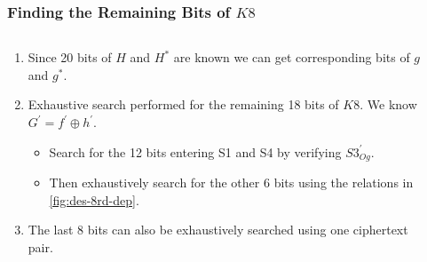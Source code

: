 \documentclass{beamer}
\begin{document}
    \begin{frame}
        \frametitle{Finding the Remaining Bits of \(K8\)}
        \begin{columns}
            \begin{column}{0.6\linewidth}
                \begin{enumerate}
                    \item<1-> Since 20 bits of \(H\) and \(H^*\) are known we
                    can get corresponding bits of \(g\) and \(g^*\). 
                    \item<2-> Exhaustive search performed for the remaining 18
                    bits of \(K8\). We know \(G^\prime = f^\prime \oplus
                    h^\prime\).
                    \begin{itemize}
                        \item Search for the 12 bits entering S1 and S4 by
                        verifying \(S3_{Og}^\prime\).
                        \item Then exhaustively search for the other 6 bits
                        using the relations in \cref{fig:des-8rd-dep}.
                    \end{itemize}
                    \item<3-> The last 8 bits can also be exhaustively searched
                    using one ciphertext pair.
                \end{enumerate}
            \end{column}
            \begin{column}{0.4\linewidth}
            \end{column}
        \end{columns}
    \end{frame}
\end{document}
